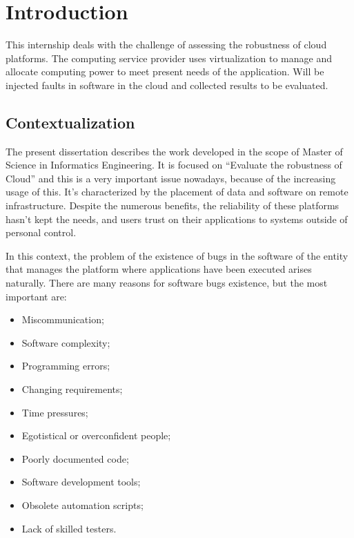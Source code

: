 \clearpage
\section{Introduction}

This internship deals with the challenge of assessing the robustness of cloud platforms. The computing service provider uses virtualization to manage and allocate computing power to meet present needs of the application. Will be injected faults in software in the cloud and collected results to be evaluated.

\subsection{Contextualization}


The present dissertation describes the work developed in the scope of Master of Science in Informatics Engineering. It is focused on ``Evaluate the robustness of Cloud'' and this is a very important issue nowadays, because of the increasing usage of this.
It's characterized by the placement of data and software on remote infrastructure. Despite the numerous benefits, the reliability of these platforms hasn't kept the needs, and users trust on their applications to systems outside of personal control.

In this context, the problem of the existence of bugs in the software of the entity that manages the platform where applications have been executed arises naturally. There are many reasons for software bugs existence, but the most important are:

\begin{itemize}
	\item Miscommunication;
	\item Software complexity;
	\item Programming errors;
	\item Changing requirements;
	\item Time pressures;
	\item Egotistical or overconfident people;
	\item Poorly documented code;
	\item Software development tools;
	\item Obsolete automation scripts;
	\item Lack of skilled testers.
\end{itemize}

